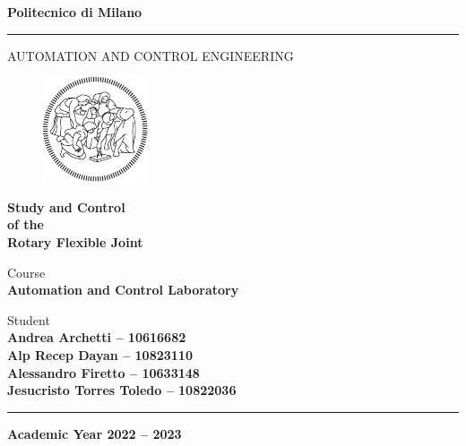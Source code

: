 \documentclass[a4paper,12pt,openright,notitlepage,oneside]{book}
\begin{document}
	\begin{titlepage}

		\begin{center}
			\Large{\textbf{Politecnico di Milano}} \\
			\vspace{-4mm}
			\rule{\textwidth}{0.4pt}
			\normalsize{AUTOMATION AND CONTROL ENGINEERING} \\
			\vspace{24mm}
			
			\begin{figure}[h!]
				\centering
				\includegraphics[height=0.30\textheight]{images/Template/logo_poli_bianco.pdf}
			\end{figure}

			\vspace{25mm}

			\huge{\textbf{Study and Control}} \\
			\huge{\textbf{of the}} \\
			\huge{\textbf{Rotary Flexible Joint}} \\
			\vspace{15mm}
		\end{center}

		
		\begin{flushright}
			\normalsize{Course} \\
			\small{\textbf{Automation and Control Laboratory}} \\
		\end{flushright}

		\vspace{0.5mm}

		\begin{flushright}
			\normalsize{Student} \\
			\small{\textbf{Andrea Archetti -- 10616682}} \\
			\small{\textbf{Alp Recep Dayan -- 10823110}} \\
			\small{\textbf{Alessandro 	Firetto -- 10633148}} \\
			\small{\textbf{Jesucristo Torres Toledo -- 10822036}} \\
		\end{flushright}

		\begin{center}
			\rule{\textwidth}{0.4pt}
			\small{\textbf{Academic Year 2022 -- 2023}}
		\end{center}
	\end{titlepage}
\end{document}
